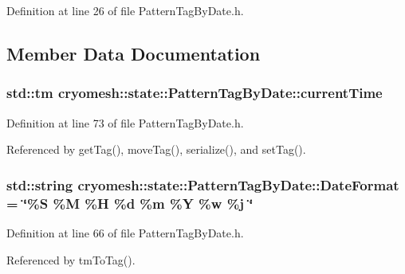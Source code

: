 \-Definition at line 26 of file \-Pattern\-Tag\-By\-Date.\-h.



\subsection{\-Member \-Data \-Documentation}
\hypertarget{classcryomesh_1_1state_1_1PatternTagByDate_ad80a0a36ec25f13a65c8beadc349c58c}{
\subsubsection[{current\-Time}]{\setlength{\rightskip}{0pt plus 5cm}std\-::tm {\bf cryomesh\-::state\-::\-Pattern\-Tag\-By\-Date\-::current\-Time}}}\label{classcryomesh_1_1state_1_1PatternTagByDate_ad80a0a36ec25f13a65c8beadc349c58c}


\-Definition at line 73 of file \-Pattern\-Tag\-By\-Date.\-h.



\-Referenced by get\-Tag(), move\-Tag(), serialize(), and set\-Tag().

\hypertarget{classcryomesh_1_1state_1_1PatternTagByDate_aa377c0641330487a3249f710b92ae7b1}{
\subsubsection[{\-Date\-Format}]{\setlength{\rightskip}{0pt plus 5cm}std\-::string {\bf cryomesh\-::state\-::\-Pattern\-Tag\-By\-Date\-::\-Date\-Format} = \char`\"{}\%\-S \%\-M \%\-H \%d \%m \%\-Y \%w \%j \char`\"{}}}\label{classcryomesh_1_1state_1_1PatternTagByDate_aa377c0641330487a3249f710b92ae7b1}


\-Definition at line 66 of file \-Pattern\-Tag\-By\-Date.\-h.



\-Referenced by tm\-To\-Tag().

